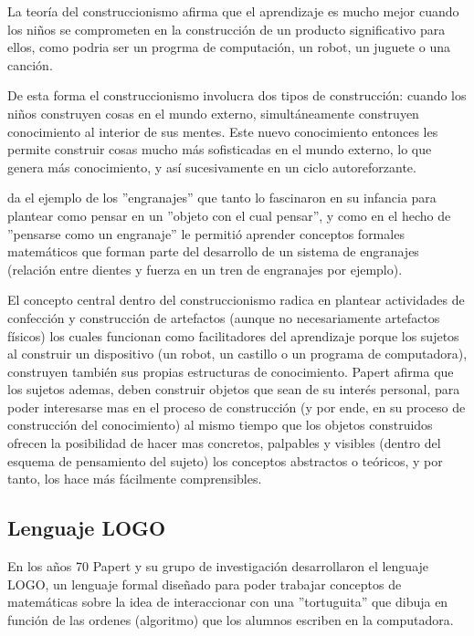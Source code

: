
La  teoría  del  construccionismo  afirma  que  el  aprendizaje  es  mucho  mejor  cuando  los  niños  se
comprometen en la construcción de un producto significativo para ellos, como podria ser un progrma de computación, un robot, un juguete o una canción.

De esta forma el construccionismo involucra dos tipos de construcción: cuando los niños construyen
cosas en el mundo externo, simultáneamente construyen conocimiento al interior de sus mentes.  Este
nuevo  conocimiento  entonces  les  permite  construir  cosas  mucho  más  sofisticadas  en  el  mundo
externo, lo que genera más conocimiento, y así sucesivamente en un ciclo autoreforzante.

\cite{seymour_papert_desafio_1987}  da el ejemplo de los ''engranajes'' que tanto lo fascinaron en su infancia para plantear como pensar en un ''objeto con el cual pensar'', y como en el hecho de ''pensarse como un engranaje'' le permitió aprender conceptos formales matemáticos que forman parte del desarrollo de un sistema de engranajes (relación entre dientes y fuerza en un tren de engranajes por ejemplo).

El concepto central dentro del construccionismo radica en plantear actividades de confección y construcción de artefactos (aunque no necesariamente artefactos físicos) los cuales funcionan como facilitadores del aprendizaje porque los sujetos al construir un dispositivo (un robot, un castillo o un programa de computadora), construyen también sus propias estructuras de conocimiento. Papert afirma que los sujetos ademas, deben construir objetos que sean de su interés personal, para poder interesarse mas en el proceso de construcción (y por ende, en su proceso de construcción del conocimiento) al mismo tiempo que los objetos construidos ofrecen la posibilidad de hacer mas concretos, palpables y visibles (dentro del esquema de pensamiento del sujeto) los conceptos abstractos o teóricos, y por tanto, los hace más fácilmente comprensibles.

\subsection{Lenguaje LOGO}

En los años 70 Papert y su grupo de investigación desarrollaron el lenguaje LOGO, un lenguaje formal \citet{giro_lenguaje_2015} diseñado para poder trabajar conceptos de matemáticas sobre la idea de interaccionar con una ''tortuguita'' que dibuja en función de las ordenes (algoritmo) que los alumnos escriben en la computadora.

